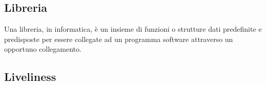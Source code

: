 
\subsection*{Libreria}
Una libreria, in informatica, è un insieme di funzioni o strutture dati predefinite e predisposte per essere collegate ad un programma software attraverso un opportuno collegamento.

\subsection*{Liveliness}

